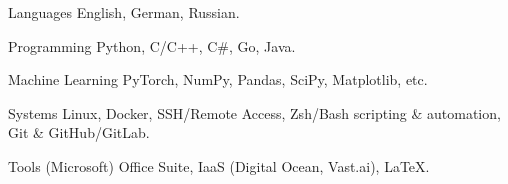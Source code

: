 

\begin{cvskills}

\cvskill
  {Languages} %
  {English, German, Russian.} %
    
    

  \cvskill
    {Programming} %
    {Python, C/C++, C\#, Go, Java.} %
    
    \cvskill
    {Machine Learning} %
    {PyTorch, NumPy, Pandas, SciPy, Matplotlib, etc.} %

  \cvskill
    {Systems} %
    {Linux, Docker, SSH/Remote Access, Zsh/Bash scripting \& automation, Git \& GitHub/GitLab.} %

  \cvskill
    {Tools}
    {(Microsoft) Office Suite, IaaS (Digital Ocean, Vast.ai), LaTeX.}
\end{cvskills}
